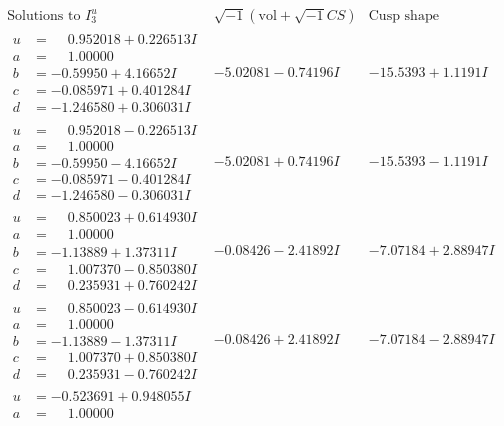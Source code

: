 \documentclass[1p]{elsarticle_modified}
\theoremstyle{definition}
\newcommand{\I}{\sqrt{-1}}
\begin{document}
$$\begin{array}{c|c|c}  
\text{Solutions to }I^u_{3}& \I (\text{vol} + \sqrt{-1}CS) & \text{Cusp shape}\\
 \hline 
\begin{aligned}
u &= \phantom{-}0.952018 + 0.226513 I \\
a &= \phantom{-}1.00000\phantom{ +0.000000I} \\
b &= -0.59950 + 4.16652 I \\
c &= -0.085971 + 0.401284 I \\
d &= -1.246580 + 0.306031 I\end{aligned}
 & -5.02081 - 0.74196 I & -15.5393 + 1.1191 I \\ \hline\begin{aligned}
u &= \phantom{-}0.952018 - 0.226513 I \\
a &= \phantom{-}1.00000\phantom{ +0.000000I} \\
b &= -0.59950 - 4.16652 I \\
c &= -0.085971 - 0.401284 I \\
d &= -1.246580 - 0.306031 I\end{aligned}
 & -5.02081 + 0.74196 I & -15.5393 - 1.1191 I \\ \hline\begin{aligned}
u &= \phantom{-}0.850023 + 0.614930 I \\
a &= \phantom{-}1.00000\phantom{ +0.000000I} \\
b &= -1.13889 + 1.37311 I \\
c &= \phantom{-}1.007370 - 0.850380 I \\
d &= \phantom{-}0.235931 + 0.760242 I\end{aligned}
 & -0.08426 - 2.41892 I & -7.07184 + 2.88947 I \\ \hline\begin{aligned}
u &= \phantom{-}0.850023 - 0.614930 I \\
a &= \phantom{-}1.00000\phantom{ +0.000000I} \\
b &= -1.13889 - 1.37311 I \\
c &= \phantom{-}1.007370 + 0.850380 I \\
d &= \phantom{-}0.235931 - 0.760242 I\end{aligned}
 & -0.08426 + 2.41892 I & -7.07184 - 2.88947 I \\ \hline\begin{aligned}
u &= -0.523691 + 0.948055 I \\
a &= \phantom{-}1.00000\phantom{ +0.000000I} \\

\end{aligned}
\end{array}$$
\end{document}
